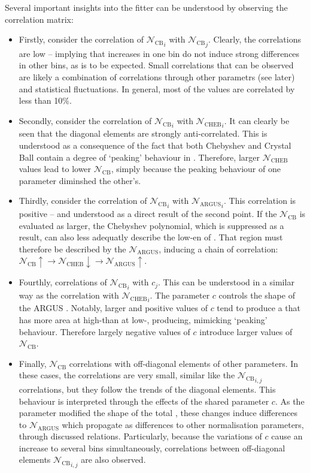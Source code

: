 Several important insights into the fitter can be understood by observing the correlation matrix:
\begin{itemize}
\item
Firstly, consider the correlation of ${\mathcal{N}_{\mathrm{CB}}}_i$ with ${\mathcal{N}_{\mathrm{CB}}}_j$.
Clearly, the correlations are low -- implying that increases in one bin do not induce strong differences in other bins, as is to be expected.
Small correlations that can be observed are likely a combination of correlations through other parametrs (see later) and statistical fluctuations.
In general, most of the values are correlated by less than 10\%.
\item Secondly, consider the correlation of ${\mathcal{N}_{\mathrm{CB}}}_i$ with ${\mathcal{N}_{\mathrm{CHEB}}}_i$.
It can clearly be seen that the diagonal elements are strongly anti-correlated.
This is understood as a consequence of the fact that both Chebyshev and Crystal Ball  contain a degree of `peaking' behaviour in \Mbc.
Therefore, larger $\mathcal{N}_{\mathrm{CHEB}}$ values lead to lower ${\mathcal{N}_{\mathrm{CB}}}$, simply because the peaking behaviour of one parameter diminshed the other's.
\item Thirdly, consider the correlation of ${\mathcal{N}_{\mathrm{CB}}}_i$ with ${\mathcal{N}_{\mathrm{ARGUS}}}_i$.
This correlation is positive -- and understood as a direct result of the second point.
If the $\mathcal{N}_{\mathrm{CB}}$ is evaluated as larger, the Chebyshev polynomial, which is suppressed as a result, can also less adequatly describe the low-en of \Mbc.
That region must therefore be described by the $\mathcal{N}_{\mathrm{ARGUS}}$, inducing a chain of correlation: $\mathcal{N}_{\mathrm{CB}}\uparrow\rightarrow{\mathcal{N}_{\mathrm{CHEB}}}\downarrow\rightarrow\mathcal{N}_{\mathrm{ARGUS}}\uparrow$.
\item Fourthly, correlations of ${\mathcal{N}_{\mathrm{CB}}}_i$ with $c_j$.
This can be understood in a similar way as the correlation with ${\mathcal{N}_{\mathrm{CHEB}}}_i$.
The parameter $c$ controls the shape of the ARGUS .
Notably, larger and positive values of $c$ tend to produce a \PDF that has more area at high-\Mbc than at low-\Mbc, producing, mimicking `peaking' behaviour.
Therefore largely negative values of $c$ introduce larger values of $\mathcal{N}_{\mathrm{CB}}$.
\item Finally, $\mathcal{N}_{\mathrm{CB}}$ correlations with off-diagonal elements of other parameters.
In these cases, the correlations are very small, similar like the ${\mathcal{N}_{\mathrm{CB}}}_{i,j}$ correlations, but they follow the trends of the diagonal elements.
This behaviour is interpreted through the effects of the shared parameter $c$.
As the parameter modified the shape of the total \PDF, these changes induce differences to $\mathcal{N}_{\mathrm{ARGUS}}$ which propagate as differences to other normalisation parameters, through discussed relations.
Particularly, because the variations of $c$ cause an increase to several bins simultaneously, correlations between off-diagonal elements ${\mathcal{N}_{\mathrm{CB}}}_{i,j}$ are also observed.
\end{itemize}

